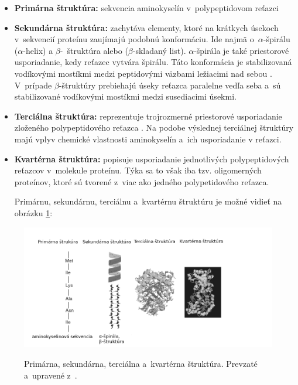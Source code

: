 \begin{itemize}
	\item \textbf{Primárna štruktúra:} sekvencia aminokyselín v~polypeptidovom reťazci
	\item \textbf{Sekundárna štruktúra:} zachytáva elementy, ktoré na krátkych úsekoch v~sekvencií proteínu zaujímajú podobnú konformáciu. Ide najmä o~$\alpha$\--špirálu ($\alpha$\--helix) a $\beta$\--~štruktúra alebo ($\beta$\--skladaný list). $\alpha$\--špirála je také priestorové usporiadanie, kedy reťazec vytvára špirálu. Táto konformácia je stabilizovaná vodíkovými mostíkmi medzi peptidovými väzbami ležiacimi nad sebou \cite{bibid}. V~prípade $\beta$\--štruktúry prebiehajú úseky reťazca paralelne vedľa seba a~sú stabilizované vodíkovými mostíkmi medzi susediacimi úsekmi.
	\item \textbf{Terciálna štruktúra:} reprezentuje trojrozmerné priestorové usporiadanie zloženého polypeptidového reťazca \cite{aminokyseliny}. Na podobe výslednej terciálnej štruktúry majú vplyv chemické vlastnosti aminokyselín a~ich usporiadanie v reťazci. 
	\item \textbf{Kvartérna štruktúra:} popisuje usporiadanie jednotlivých polypeptidových reťazcov v~molekule proteínu. Týka sa to však iba tzv. oligomerných proteínov, ktoré sú tvorené z~viac ako jedného polypetidového reťazca.
	
	Primárnu, sekundárnu, terciálnu a~kvartérnu štruktúru je možné vidieť na obrázku \ref{struktura}:
\end{itemize}
\begin{figure}[H]
		\begin{center}
		\scalebox{0.5}
		{   
			\includegraphics{structure.png}
		}
		\caption{Primárna, sekundárna, terciálna a~kvartérna štruktúra. Prevzaté a~upravené z~\cite{gromiha}.}
		\label{struktura}
	\end{center}
\end{figure}


